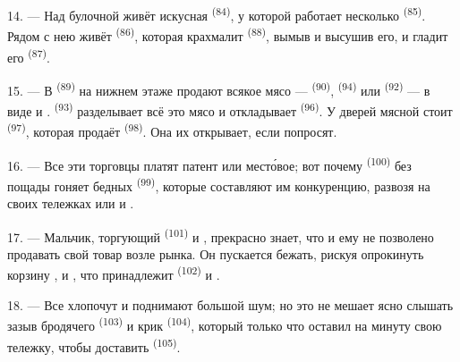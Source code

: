 14. --- Над булочной живёт искусная  \textsuperscript{(84)}, у
которой работает несколько  \textsuperscript{(85)}. Рядом с
нею живёт  \textsuperscript{(86)}, которая крахмалит
 \textsuperscript{(88)}, вымыв и высушив его, и гладит его
 \textsuperscript{(87)}.

\VUsaut{4.0mm}
\VUsaut{3.0mm}

15. --- В  \textsuperscript{(89)} на нижнем этаже продают
всякое мясо ---  \textsuperscript{(90)}, 
\textsuperscript{(94)} или  \textsuperscript{(92)} --- в виде
 и .
 \textsuperscript{(93)} разделывает всё это мясо и
откладывает  \textsuperscript{(96)}. У дверей мясной стоит
 \textsuperscript{(97)}, которая продаёт
 \textsuperscript{(98)}. Она их открывает, если попросят.

16. --- Все эти торговцы платят патент или место́вое; вот почему
 \textsuperscript{(100)} без пощады гоняет бедных
 \textsuperscript{(99)}, которые составляют им
конкуренцию, развозя на своих тележках 
или  и
.

\VUsaut{4.0mm}
\VUsaut{3.0mm}

17. --- Мальчик, торгующий  \textsuperscript{(101)} и
, прекрасно знает, что и ему не позволено продавать свой
товар возле рынка. Он пускается бежать, рискуя опрокинуть корзину
,  и , что принадлежит
 \textsuperscript{(102)}  и
.

18. --- Все хлопочут и поднимают большой шум; но это не мешает ясно
слышать зазыв бродячего  \textsuperscript{(103)} и крик
 \textsuperscript{(104)}, который только что оставил на минуту
свою тележку, чтобы доставить  \textsuperscript{(105)}.
\VUsaut{6.0mm}
\VUfilet{22mm}

